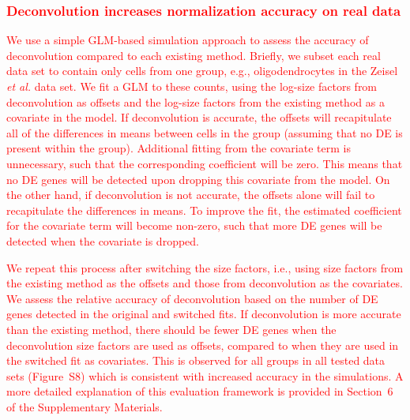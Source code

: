 \documentclass{bmcart}
\newcommand{\supprealassess}{6}
\newcommand{\suppdeassess}{S8}
\newcommand{\revised}[1]{\textcolor{red}{#1}}
\begin{document}
\revised{\subsubsection*{Deconvolution increases normalization accuracy on real data}
We use a simple GLM-based simulation approach to assess the accuracy of deconvolution compared to each existing method.
Briefly, we subset each real data set to contain only cells from one group, e.g., oligodendrocytes in the Zeisel \emph{et al.} data set.
We fit a GLM to these counts, using the log-size factors from deconvolution as offsets and the log-size factors from the existing method as a covariate in the model.
If deconvolution is accurate, the offsets will recapitulate all of the differences in means between cells in the group (assuming that no DE is present within the group).
Additional fitting from the covariate term is unnecessary, such that the corresponding coefficient will be zero.
This means that no DE genes will be detected upon dropping this covariate from the model.
On the other hand, if deconvolution is not accurate, the offsets alone will fail to recapitulate the differences in means.
To improve the fit, the estimated coefficient for the covariate term will become non-zero, such that more DE genes will be detected when the covariate is dropped.}

\revised{We repeat this process after switching the size factors, i.e., using size factors from the existing method as the offsets and those from deconvolution as the covariates. 
We assess the relative accuracy of deconvolution based on the number of DE genes detected in the original and switched fits.
If deconvolution is more accurate than the existing method, there should be fewer DE genes when the deconvolution size factors are used as offsets, compared to when they are used in the switched fit as covariates.
This is observed for all groups in all tested data sets (Figure~\suppdeassess{}) which is consistent with increased accuracy in the simulations.
A more detailed explanation of this evaluation framework is provided in Section~\supprealassess{} of the Supplementary Materials.
}
\end{document}
